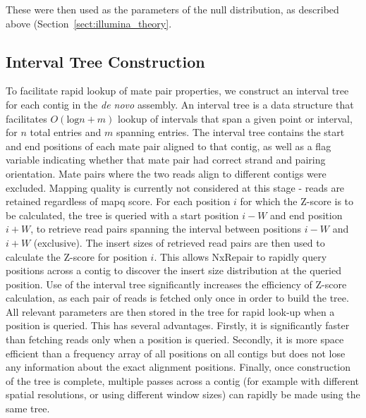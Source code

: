 These were then used as the parameters of the null distribution, as described above (Section~\ref{sect:illumina_theory}.

\subsection{Interval Tree Construction}
To facilitate rapid lookup of mate pair properties, we construct an interval tree~\cite{cormen2009} for each contig in the \textit{de novo} assembly. An interval tree is a data structure that facilitates $O(\text{log} n + m)$ lookup of intervals that span a given point or interval, for $n$ total entries and $m$ spanning entries. The interval tree contains the start and end positions of each mate pair aligned to that contig, as well as a flag variable indicating whether that mate pair had correct strand and pairing orientation. Mate pairs where the two reads align to different contigs were excluded. Mapping quality is currently not considered at this stage - reads are retained regardless of mapq score. For each position $i$ for which the Z-score is to be calculated, the tree is queried with a start position $i-W$ and end position $i+W$, to retrieve read pairs spanning the interval between positions $i-W$ and $i+W$ (exclusive). The insert sizes of retrieved read pairs are then used to calculate the Z-score for position $i$. This allows NxRepair to rapidly query positions across a contig to discover the insert size distribution at the queried position. Use of the interval tree significantly increases the efficiency of Z-score calculation, as each pair of reads is fetched only once in order to build the tree. All relevant parameters are then stored in the tree for rapid look-up when a position is queried. This has several advantages. Firstly, it is significantly faster than fetching reads only when a position is queried. Secondly, it is more space efficient than a frequency array of all positions on all contigs but does not lose any information about the exact alignment positions. Finally, once construction of the tree is complete, multiple passes across a contig (for example with different spatial resolutions, or using different window sizes) can rapidly be made using the same tree.      

